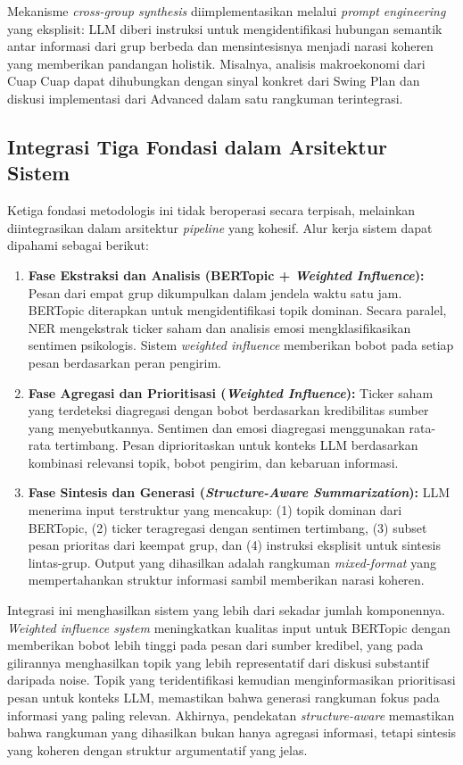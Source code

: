 Mekanisme \textit{cross-group synthesis} diimplementasikan melalui \textit{prompt engineering} yang eksplisit: LLM diberi instruksi untuk mengidentifikasi hubungan semantik antar informasi dari grup berbeda dan mensintesisnya menjadi narasi koheren yang memberikan pandangan holistik. Misalnya, analisis makroekonomi dari Cuap Cuap dapat dihubungkan dengan sinyal konkret dari Swing Plan dan diskusi implementasi dari Advanced dalam satu rangkuman terintegrasi.

\subsection{Integrasi Tiga Fondasi dalam Arsitektur Sistem}

Ketiga fondasi metodologis ini tidak beroperasi secara terpisah, melainkan diintegrasikan dalam arsitektur \textit{pipeline} yang kohesif. Alur kerja sistem dapat dipahami sebagai berikut:

\begin{enumerate}
\item \textbf{Fase Ekstraksi dan Analisis (BERTopic + \textit{Weighted Influence}):} Pesan dari empat grup dikumpulkan dalam jendela waktu satu jam. BERTopic diterapkan untuk mengidentifikasi topik dominan. Secara paralel, NER mengekstrak ticker saham dan analisis emosi mengklasifikasikan sentimen psikologis. Sistem \textit{weighted influence} memberikan bobot pada setiap pesan berdasarkan peran pengirim.

\item \textbf{Fase Agregasi dan Prioritisasi (\textit{Weighted Influence}):} Ticker saham yang terdeteksi diagregasi dengan bobot berdasarkan kredibilitas sumber yang menyebutkannya. Sentimen dan emosi diagregasi menggunakan rata-rata tertimbang. Pesan diprioritaskan untuk konteks LLM berdasarkan kombinasi relevansi topik, bobot pengirim, dan kebaruan informasi.

\item \textbf{Fase Sintesis dan Generasi (\textit{Structure-Aware Summarization}):} LLM menerima input terstruktur yang mencakup: (1) topik dominan dari BERTopic, (2) ticker teragregasi dengan sentimen tertimbang, (3) subset pesan prioritas dari keempat grup, dan (4) instruksi eksplisit untuk sintesis lintas-grup. Output yang dihasilkan adalah rangkuman \textit{mixed-format} yang mempertahankan struktur informasi sambil memberikan narasi koheren.
\end{enumerate}

Integrasi ini menghasilkan sistem yang lebih dari sekadar jumlah komponennya. \textit{Weighted influence system} meningkatkan kualitas input untuk BERTopic dengan memberikan bobot lebih tinggi pada pesan dari sumber kredibel, yang pada gilirannya menghasilkan topik yang lebih representatif dari diskusi substantif daripada noise. Topik yang teridentifikasi kemudian menginformasikan prioritisasi pesan untuk konteks LLM, memastikan bahwa generasi rangkuman fokus pada informasi yang paling relevan. Akhirnya, pendekatan \textit{structure-aware} memastikan bahwa rangkuman yang dihasilkan bukan hanya agregasi informasi, tetapi sintesis yang koheren dengan struktur argumentatif yang jelas.

